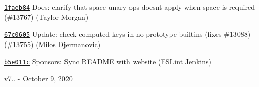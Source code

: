 \begin{DoxyItemize}
\item \href{https://github.com/eslint/eslint/commit/1faeb84e663d88c5d85a3cb3f15cd224cc552c2d}{\texttt{ {\ttfamily 1faeb84}}} Docs\+: clarify that space-\/unary-\/ops doesn\textquotesingle{}t apply when space is required (\#13767) (Taylor Morgan)
\item \href{https://github.com/eslint/eslint/commit/67c06059dd1ddcee6f369c650ce71220da1510c3}{\texttt{ {\ttfamily 67c0605}}} Update\+: check computed keys in no-\/prototype-\/builtins (fixes \#13088) (\#13755) (Milos Djermanovic)
\item \href{https://github.com/eslint/eslint/commit/b5e011c865e95d700d29cb9a4ba71c671d99e423}{\texttt{ {\ttfamily b5e011c}}} Sponsors\+: Sync README with website (ESLint Jenkins)
\end{DoxyItemize}

v7.. -\/ October 9, 2020


